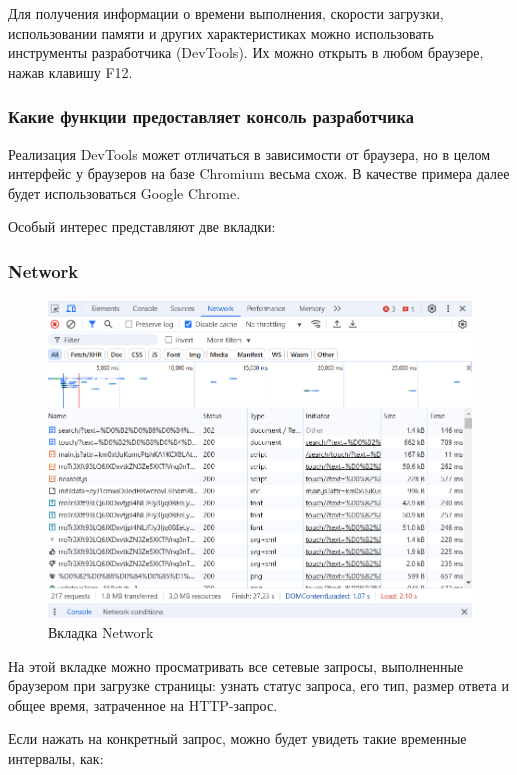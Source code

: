 \documentclass[12pt]{article}
\begin{document}
Для получения информации о времени выполнения, скорости загрузки,
использовании памяти и других характеристиках можно использовать инструменты разработчика (DevTools).
Их можно открыть в любом браузере, нажав клавишу F12.

\subsubsection{Какие функции предоставляет консоль разработчика}

Реализация DevTools может отличаться в зависимости от браузера,
но в целом интерфейс у браузеров на базе Chromium весьма схож.
В качестве примера далее будет использоваться Google Chrome.

Особый интерес представляют две вкладки:

\subsubsection{Network}

\begin{figure}[H]
    \centering
    \includegraphics[width=1\textwidth]{../images/network.png}
    \caption{Вкладка Network}
\end{figure}

На этой вкладке можно просматривать все сетевые запросы, выполненные браузером при загрузке страницы:
узнать статус запроса, его тип, размер ответа и общее время, затраченное на HTTP-запрос.

Если нажать на конкретный запрос, можно будет увидеть такие временные интервалы, как:
\end{document}

